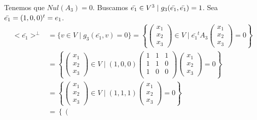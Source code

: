 \begin{ejercicio}
\begin{enumerate}
\begin{enumerate}
            Tenemos que $Nul(A_3)=0$. Buscamos $\Bar{e_1}\in V^3 \mid g_3(\Bar{e_1},\Bar{e_1})=1$. Sea $\Bar{e_1}=(1,0,0)^t=e_1$.
            \begin{equation*}\begin{split}
                <\bar{e_1}>^\perp &= \{v \in V \mid g_3(\bar{e_1},v) = 0\} 
                = \left\{ \left(\begin{array}{c}
                     x_1 \\ x_2 \\ x_3
                \end{array} \right) \in V \mid \bar{e_1}^t A_3
                \left(\begin{array}{c}
                     x_1 \\ x_2 \\ x_3
                \end{array} \right) = 0\right\} \\
                &= \left\{ \left(\begin{array}{c}
                     x_1 \\ x_2 \\ x_3
                \end{array} \right) \in V \mid (1,0,0)\left(\begin{array}{ccc}
                    1 & 1 & 1 \\
                    1 & 1 & 0 \\
                    1 & 0 & 0 \\
                \end{array} \right) 
                \left(\begin{array}{c}
                     x_1 \\ x_2 \\ x_3
                \end{array} \right) = 0\right\} \\
                &= \left\{ \left(\begin{array}{c}
                     x_1 \\ x_2 \\ x_3
                \end{array} \right) \in V \mid (1,1,1)
                \left(\begin{array}{c}
                     x_1 \\ x_2 \\ x_3
                \end{array} \right) = 0\right\} \\
                &= \left\{ \left(\begin{array}{c}

\end{array}
\end{split}
\end{equation*}
\end{enumerate}
\end{enumerate}
\end{ejercicio}
